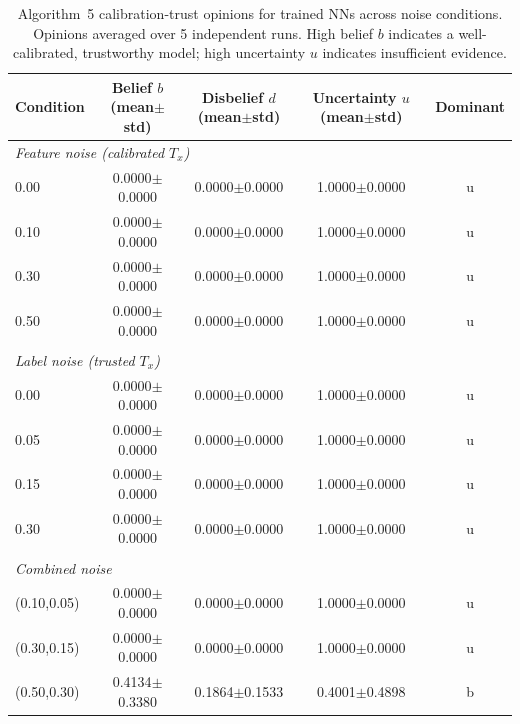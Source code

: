 \begin{table}[ht]
\centering
\caption{Algorithm~5 calibration-trust opinions for trained NNs across noise conditions. Opinions averaged over 5 independent runs. High belief $b$ indicates a well-calibrated, trustworthy model; high uncertainty $u$ indicates insufficient evidence.}
\label{tab:calibration-trust}
\begin{tabular}{lcccc}
\toprule
Condition & Belief $b$ (mean$\pm$std) & Disbelief $d$ (mean$\pm$std) & Uncertainty $u$ (mean$\pm$std) & Dominant \\
\midrule
\multicolumn{5}{l}{\textit{Feature noise (calibrated $T_x$)}} \\
0.00 & 0.0000$\pm$0.0000 & 0.0000$\pm$0.0000 & 1.0000$\pm$0.0000 & u \\
0.10 & 0.0000$\pm$0.0000 & 0.0000$\pm$0.0000 & 1.0000$\pm$0.0000 & u \\
0.30 & 0.0000$\pm$0.0000 & 0.0000$\pm$0.0000 & 1.0000$\pm$0.0000 & u \\
0.50 & 0.0000$\pm$0.0000 & 0.0000$\pm$0.0000 & 1.0000$\pm$0.0000 & u \\
\midrule \\
\multicolumn{5}{l}{\textit{Label noise (trusted $T_x$)}} \\
0.00 & 0.0000$\pm$0.0000 & 0.0000$\pm$0.0000 & 1.0000$\pm$0.0000 & u \\
0.05 & 0.0000$\pm$0.0000 & 0.0000$\pm$0.0000 & 1.0000$\pm$0.0000 & u \\
0.15 & 0.0000$\pm$0.0000 & 0.0000$\pm$0.0000 & 1.0000$\pm$0.0000 & u \\
0.30 & 0.0000$\pm$0.0000 & 0.0000$\pm$0.0000 & 1.0000$\pm$0.0000 & u \\
\midrule \\
\multicolumn{5}{l}{\textit{Combined noise}} \\
(0.10,0.05) & 0.0000$\pm$0.0000 & 0.0000$\pm$0.0000 & 1.0000$\pm$0.0000 & u \\
(0.30,0.15) & 0.0000$\pm$0.0000 & 0.0000$\pm$0.0000 & 1.0000$\pm$0.0000 & u \\
(0.50,0.30) & 0.4134$\pm$0.3380 & 0.1864$\pm$0.1533 & 0.4001$\pm$0.4898 & b \\
\bottomrule
\end{tabular}
\end{table}